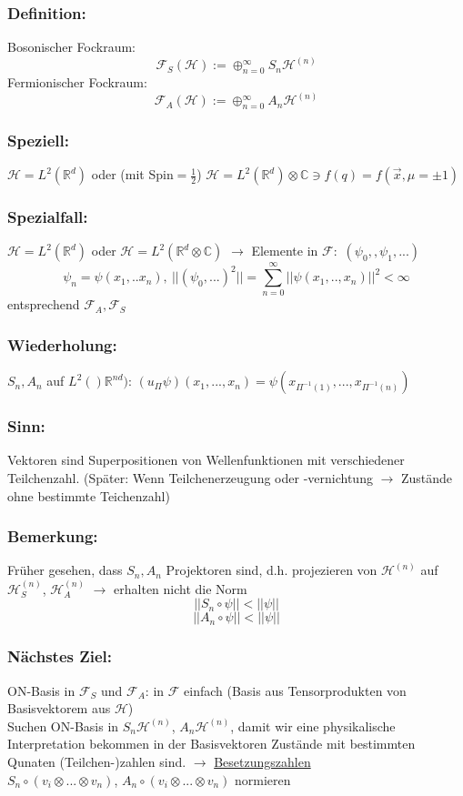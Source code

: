 \documentclass[twoside,a4paper]{scrartcl}
\newcommand{\R}{\mathbb{R}}
\newcommand{\C}{\mathbb{C}}
\renewcommand{\1}{\mathds{1}}
\newcommand{\ra}{\rightarrow}
\renewcommand{\H}{\mathcal{H}}
\newcommand{\F}{\mathcal{F}}
\renewcommand{\R}{\mathbb{R}}
\renewcommand{\C}{\mathbb{C}}
\begin{document}
\subsubsection*{Definition:} 
Bosonischer Fockraum:
$$\F_S(\H):=\oplus_{n=0}^\infty S_n \H^{(n)}$$
Fermionischer Fockraum:
$$\F_A(\H):=\oplus_{n=0}^\infty A_n \H^{(n)}$$

\subsubsection*{Speziell:} 
$\H=L^2(\R^d)$ oder (mit Spin$=\frac{1}{2}$) $\H=L^2(\R^d)\otimes\C \ni f(q)=f(\vec x, \mu=\pm 1)$
\subsubsection*{Spezialfall:} 
$\H=L^2(\R^d)$ oder $\H=L^2(\R^d \otimes \C)$ $\ra$ Elemente in $\F:$ $(\psi_0,,\psi_1,...)$
$$\psi_n=\psi(x_1,..x_n), \ ||(\psi_0,...)^2||=\sum_{n=0}^\infty ||\psi(x_1,..,x_n)||^2 < \infty$$
entsprechend $\F_A, \F_S$

\subsubsection*{Wiederholung:} 
$S_n,A_n$ auf $L^2()\R^{nd})$: $(u_\Pi\psi)(x_1,...,x_n)=\psi(x_{\Pi^{-1}(1)},...,x_{\Pi^{-1}(n)})$

\subsubsection*{Sinn:} 
Vektoren sind Superpositionen von Wellenfunktionen mit verschiedener Teilchenzahl. (Später: Wenn Teilchenerzeugung oder -vernichtung $\ra$ Zustände ohne bestimmte Teichenzahl)

\subsubsection*{Bemerkung:} 
Früher gesehen, dass $S_n,A_n$ Projektoren sind, d.h. projezieren von $\H^{(n)}$ auf $\H^{(n)}_S$, $\H^{(n)}_A$ $\ra$ erhalten nicht die Norm
$$||S_n \circ \psi||<||\psi|| $$
$$||A_n \circ \psi||<||\psi|| $$

\subsubsection*{Nächstes Ziel:} 
ON-Basis in $\F_S$ und $\F_A$: in $\F$ einfach (Basis aus Tensorprodukten von Basisvektorem aus $\H$)\\
Suchen ON-Basis in $S_n\H^{(n)}$, $A_n \H^{(n)}$, damit wir eine physikalische Interpretation bekommen in der Basisvektoren Zustände mit bestimmten Qunaten (Teilchen-)zahlen sind. $\ra$ \underline{Besetzungszahlen}\\
$S_n \circ (v_i \otimes ... \otimes v_n)$, $A_n \circ (v_i \otimes ... \otimes v_n)$ normieren
\end{document}
